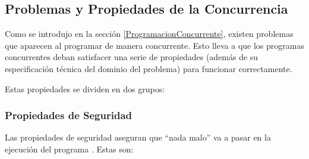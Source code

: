 \subsection{Problemas y Propiedades de la Concurrencia}
\label{ProblemasConcurrencia}

Como se introdujo en la sección \ref{ProgramacionConcurrente}, existen
problemas que aparecen al programar de manera concurrente. Esto lleva a que los
programas concurrentes deban satisfacer una serie de propiedades (además de su
especificación técnica del dominio del problema) para funcionar correctamente.

Estas propiedades se dividen en dos grupos:

\subsubsection*{Propiedades de Seguridad}
Las propiedades de seguridad aseguran que ``nada malo'' va a pasar en la
ejecución del programa \cite{PalmaConcurrente}.
Estas son:

